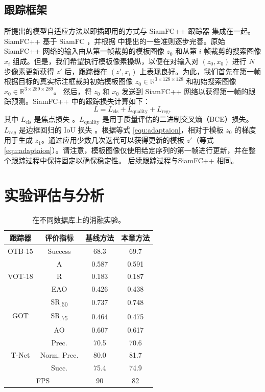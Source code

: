\subsection{跟踪框架}
所提出的模型自适应方法以即插即用的方式与 SiamFC++ 跟踪器 \cite{SiamFC++} 集成在一起。 SiamFC++ 基于 SiamFC \cite{SiamFC}，并根据 \cite{SiamFC++} 中提出的一些准则逐步完善。原始 SiamFC++ 网络的输入由从第一帧裁剪的模板图像 $z_0$ 和从第 $i$ 帧裁剪的搜索图像 $x_i$ 组成。但是，我们希望执行模板像素操纵，以便在对输入对 $(z_0, x_0)$ 进行 $N$ 步像素更新获得 $z'$ 后，跟踪器在 $(z', x_i)$ 上表现良好。为此，我们首先在第一帧根据目标的真实标注框裁剪初始模板图像 $z_0\in\mathbb R^{3\times128\times 128}$ 和初始搜索图像 $x_0\in\mathbb R^{3\times289\times 289}$。
然后，将 $z_0$ 和 $x_0$ 发送到 SiamFC++ 网络以获得第一帧的跟踪预测。SiamFC++ \cite{SiamFC++} 中的跟踪损失计算如下：
\begin{equation}
    L = L_{\text{cls}} + L_{\text{quality}} + L_{\text{reg}},
\end{equation}
其中 $L_{\text{cls}}$ 是焦点损失 \cite{focal}。$L_{\text{quality}}$ 是用于质量评估的二进制交叉熵（BCE）损失。$L_{reg}$ 是边框回归的 IoU 损失 \cite{yu2016unitbox}。根据等式 \ref{equ:adaptaion}，相对于模板 $z_0$ 的梯度用于生成 $z_1$。通过应用少数几次迭代可以获得更新的模板 $z'$（等式 \ref{equ:adaptaion}）。请注意，模板图像仅使用给定序列的第一帧进行更新，并在整个跟踪过程中保持固定以确保稳定性。
后续跟踪过程与SiamFC++ 相同。

\section{实验评估与分析}

\begin{table}[t]
\caption{在不同数据库上的消融实验。}
\begin{center}
\begin{tabular}{c cc c}
\toprule
跟踪器 & 评价指标 & 基线方法 & 本章方法\\
\midrule
\multirow{1}{*}{OTB-15} 
& Success & 68.3 & 69.7\\
\midrule
\multirow{3}{*}{VOT-18}
& A   & 0.587 & 0.591 \\
& R   & 0.183 & 0.187 \\
& EAO & 0.426 & 0.438 \\
\midrule
\multirow{3}{*}{GOT} 
& SR\textsubscript{.50} &  0.737 & 0.748 \\
& SR\textsubscript{.75} & 0.464 & 0.475 \\
& AO & 0.607 & 0.617 \\
\midrule
\multirow{3}{*}{T-Net} 
& Prec.       & 70.5 & 70.6 \\
& Norm. Prec. & 80.0 & 81.7 \\
& Succ.       & 75.4 & 74.9 \\
\midrule
\multicolumn{2}{c}{FPS} & 90 & 82\\
\bottomrule
\end{tabular}
\end{center}
\label{tab:benchmark results}
\end{table}

